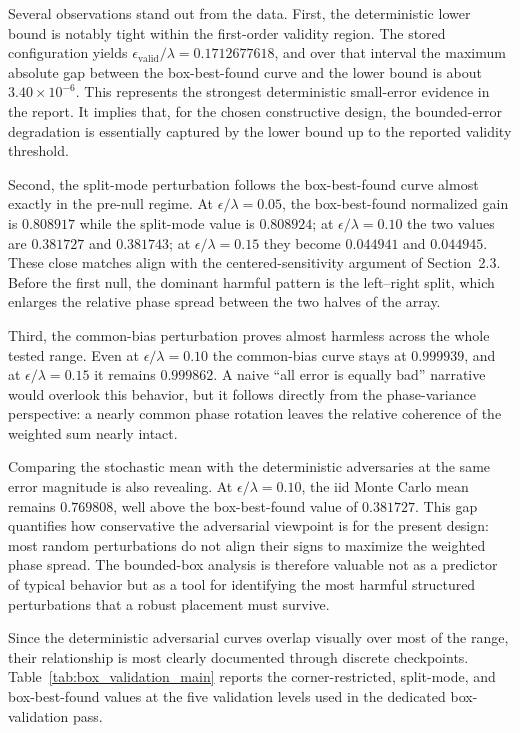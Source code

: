 Several observations stand out from the data. First, the deterministic lower bound is notably tight within the first-order validity region. The stored configuration yields $\epsilon_{\mathrm{valid}}/\lambda = 0.1712677618$, and over that interval the maximum absolute gap between the box-best-found curve and the lower bound is about $3.40 \times 10^{-6}$. This represents the strongest deterministic small-error evidence in the report. It implies that, for the chosen constructive design, the bounded-error degradation is essentially captured by the lower bound up to the reported validity threshold.

Second, the split-mode perturbation follows the box-best-found curve almost exactly in the pre-null regime. At $\epsilon/\lambda = 0.05$, the box-best-found normalized gain is $0.808917$ while the split-mode value is $0.808924$; at $\epsilon/\lambda = 0.10$ the two values are $0.381727$ and $0.381743$; at $\epsilon/\lambda = 0.15$ they become $0.044941$ and $0.044945$. These close matches align with the centered-sensitivity argument of Section~2.3. Before the first null, the dominant harmful pattern is the left–right split, which enlarges the relative phase spread between the two halves of the array.

Third, the common-bias perturbation proves almost harmless across the whole tested range. Even at $\epsilon/\lambda = 0.10$ the common-bias curve stays at $0.999939$, and at $\epsilon/\lambda = 0.15$ it remains $0.999862$. A naive “all error is equally bad” narrative would overlook this behavior, but it follows directly from the phase-variance perspective: a nearly common phase rotation leaves the relative coherence of the weighted sum nearly intact.

Comparing the stochastic mean with the deterministic adversaries at the same error magnitude is also revealing. At $\epsilon/\lambda = 0.10$, the iid Monte Carlo mean remains $0.769808$, well above the box-best-found value of $0.381727$. This gap quantifies how conservative the adversarial viewpoint is for the present design: most random perturbations do not align their signs to maximize the weighted phase spread. The bounded-box analysis is therefore valuable not as a predictor of typical behavior but as a tool for identifying the most harmful structured perturbations that a robust placement must survive.

Since the deterministic adversarial curves overlap visually over most of the range, their relationship is most clearly documented through discrete checkpoints. Table~\ref{tab:box_validation_main} reports the corner-restricted, split-mode, and box-best-found values at the five validation levels used in the dedicated box-validation pass.


